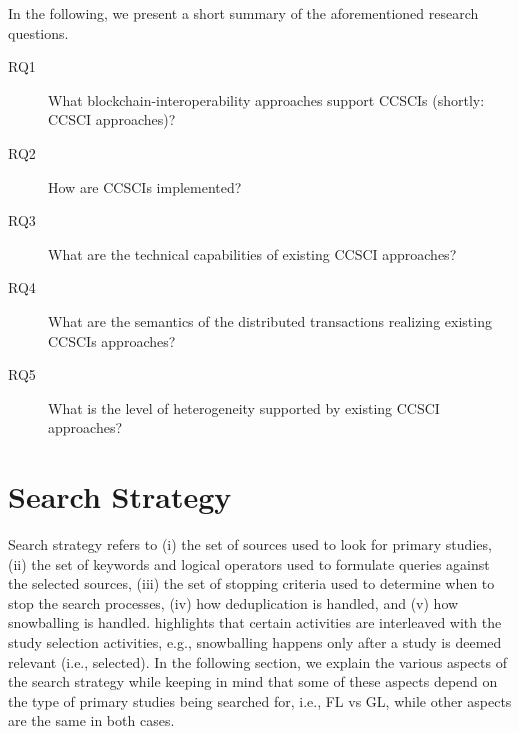 \documentclass[review]{elsarticle}
\begin{document}
In the following, we present a short summary of the aforementioned research questions.
\begin{description}
	\item[RQ1] What blockchain-interoperability approaches support CCSCIs (shortly: CCSCI approaches)?
	\item[RQ2] How are CCSCIs implemented?
	\item[RQ3] What are the technical capabilities of existing CCSCI approaches?
	\item[RQ4] What are the semantics of the distributed transactions realizing existing CCSCIs approaches?
	\item[RQ5] What is the level of heterogeneity supported by existing CCSCI approaches?
\end{description}

\section{Search Strategy}
\label{sec:search-strategy}
Search strategy refers to (i) the set of sources used to look for primary studies, (ii) the set of keywords and logical operators used to formulate queries against the selected sources, (iii) the set of stopping criteria used to determine when to stop the search processes, (iv) how deduplication is handled, and (v) how snowballing is handled.
 highlights that certain activities are interleaved with the study selection activities, e.g., snowballing happens only after a study is deemed relevant (i.e., selected).
In the following section, we explain the various aspects of the search strategy while keeping in mind that some of these aspects depend on the type of primary studies being searched for, i.e., FL vs GL, while other aspects are the same in both cases.


\end{document}
